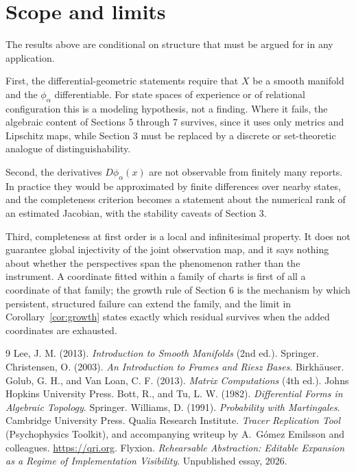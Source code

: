 \documentclass[11pt]{article}
\theoremstyle{remark}
\begin{document}
\section{Scope and limits}\label{sec:scope}

The results above are conditional on structure that must be argued for in any application.

First, the differential-geometric statements require that $X$ be a smooth manifold and the $\phi_\alpha$ differentiable. For state spaces of experience or of relational configuration this is a modeling hypothesis, not a finding. Where it fails, the algebraic content of Sections 5 through 7 survives, since it uses only metrics and Lipschitz maps, while Section 3 must be replaced by a discrete or set-theoretic analogue of distinguishability.

Second, the derivatives $D\phi_\alpha(x)$ are not observable from finitely many reports. In practice they would be approximated by finite differences over nearby states, and the completeness criterion becomes a statement about the numerical rank of an estimated Jacobian, with the stability caveats of Section 3.

Third, completeness at first order is a local and infinitesimal property. It does not guarantee global injectivity of the joint observation map, and it says nothing about whether the perspectives span the phenomenon rather than the instrument. A coordinate fitted within a family of charts is first of all a coordinate of that family; the growth rule of Section 6 is the mechanism by which persistent, structured failure can extend the family, and the limit in Corollary~\ref{cor:growth} states exactly which residual survives when the added coordinates are exhausted.

\begin{thebibliography}{9}
 Lee, J. M. (2013). \emph{Introduction to Smooth Manifolds} (2nd ed.). Springer.
 Christensen, O. (2003). \emph{An Introduction to Frames and Riesz Bases}. Birkh\"auser.
 Golub, G. H., and Van Loan, C. F. (2013). \emph{Matrix Computations} (4th ed.). Johns Hopkins University Press.
 Bott, R., and Tu, L. W. (1982). \emph{Differential Forms in Algebraic Topology}. Springer.
 Williams, D. (1991). \emph{Probability with Martingales}. Cambridge University Press.
 Qualia Research Institute. \emph{Tracer Replication Tool} (Psychophysics Toolkit), and accompanying writeup by A.\ G\'omez Emilsson and colleagues. \url{https://qri.org}.
 Flyxion. \emph{Rehearsable Abstraction: Editable Expansion as a Regime of Implementation Visibility}. Unpublished essay, 2026.
\end{thebibliography}
\end{document}
